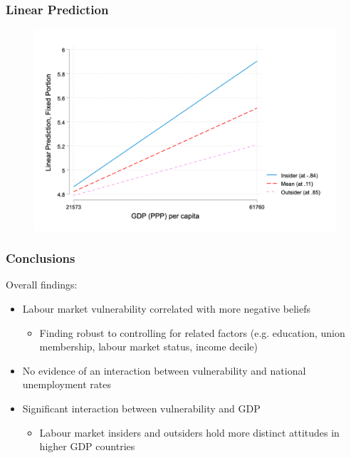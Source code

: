 \documentclass[14pt]{beamer}
\begin{document}
\begin{frame}
	\frametitle{Linear Prediction}
	\begin{figure}
		\includegraphics[width=\textwidth]{Figure_3}
	\end{figure}
\end{frame}

\begin{frame}
	\frametitle{Conclusions}
	Overall findings:
	\begin{itemize}
		\pause
		\item Labour market vulnerability correlated with more negative beliefs 
		\begin{itemize}
			\pause
			\item Finding robust to controlling for related factors (e.g. education, union membership, labour market status, income decile)
		\end{itemize}
		\pause
		\item No evidence of an interaction between vulnerability and national unemployment rates
		\pause
		\item Significant interaction between vulnerability and GDP
		\begin{itemize}
			\pause
			\item Labour market insiders and outsiders hold more distinct attitudes in higher GDP countries
		\end{itemize}
	\end{itemize}
\end{frame}
\end{document}

